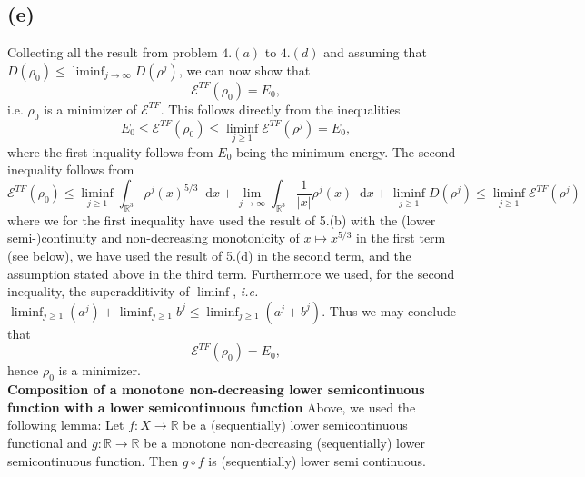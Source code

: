 \documentclass[a4paper,11pt]{article}
\newcommand{\abs}[1]{\left\lvert #1 \right\rvert}
\newcommand*\diff{\mathop{}\!\mathrm{d}}
\newcommand{\ie}{\emph{i.e.} }
\newcommand{\R}{\mathbb{R}}
\numberwithin{equation}{section}
\begin{document}
\subsection*{(e)}
Collecting all the result from problem $ 4.(a) $ to $ 4.(d) $ and assuming that $ D(\rho_0)\leq\liminf_{j\to\infty}D(\rho^j) $, we can now show that \begin{equation}
\mathcal{E}^{TF}(\rho_0)=E_0,
\end{equation}
i.e. $ \rho_0 $ is a minimizer of $ \mathcal{E}^{TF} $. This follows directly from the inequalities\begin{equation}
E_0\leq\mathcal{E}^{TF}(\rho_0)\leq\liminf_{j\geq1}\mathcal{E}^{TF}(\rho^j)=E_0,
\end{equation}
where the first inquality follows from $ E_0 $ being the minimum energy. The second inequality follows from \begin{equation}
\mathcal{E}^{TF}(\rho_0)\leq\liminf_{j\geq1}\int_{\R^3}\rho^j(x)^{5/3}\diff x+\lim\limits_{j\to\infty}\int_{\R^3}\frac{1}{\abs{x}}\rho^j(x) \diff x+\liminf_{j\geq1}D(\rho^j)\leq\liminf_{j\geq1}\mathcal{E}^{TF}(\rho^j)
\end{equation}
where we for the first inequality have used the result of 5.(b) with the (lower semi-)continuity and non-decreasing monotonicity of $ x\mapsto x^{5/3} $ in the first term (see below), we have used the result of 5.(d) in the second term, and the assumption stated above in the third term. Furthermore we used, for the second inequality, the superadditivity of $ \liminf $, \ie $ \liminf_{j\geq1}(a^j)+\liminf_{j\geq1}b^j\leq\liminf_{j\geq1}(a^j+b^j) $.
Thus we may conclude that \begin{equation}
\mathcal{E}^{TF}(\rho_0)=E_0,
\end{equation}
hence $ \rho_0 $ is a minimizer.\vspace{0.5cm}\\
\textbf{Composition of a monotone non-decreasing lower semicontinuous function with a lower semicontinuous function}
Above, we used the following lemma: Let $ f:X\to\R $ be a (sequentially) lower semicontinuous functional and $ g:\R\to\R $ be a monotone non-decreasing (sequentially) lower semicontinuous function. Then $ g\circ f $ is (sequentially) lower semi continuous.
\end{document}
